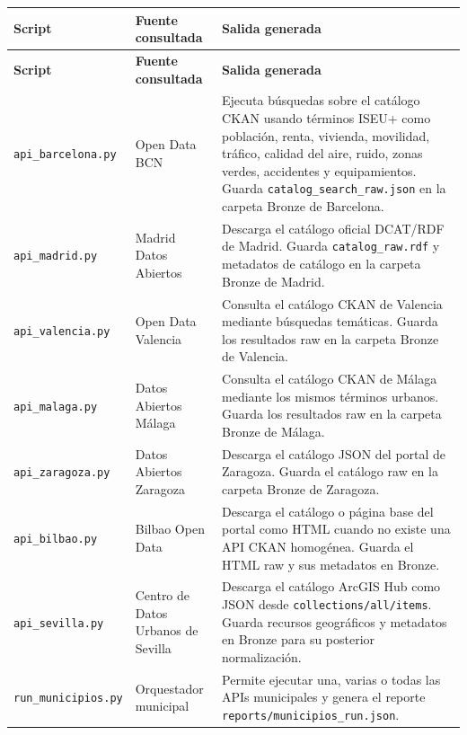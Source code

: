 \begin{longtable}{>{\raggedright\arraybackslash}p{} >{\raggedright\arraybackslash}p{} >{\raggedright\arraybackslash}p{}}
\toprule
\textbf{Script} & \textbf{Fuente consultada} & \textbf{Salida generada} \\
\midrule
\endfirsthead
\toprule
\textbf{Script} & \textbf{Fuente consultada} & \textbf{Salida generada} \\
\midrule
\endhead
\texttt{api\_barcelona.py} & Open Data BCN & Ejecuta búsquedas sobre el catálogo CKAN usando términos ISEU+ como población, renta, vivienda, movilidad, tráfico, calidad del aire, ruido, zonas verdes, accidentes y equipamientos. Guarda \texttt{catalog\_search\_raw.json} en la carpeta Bronze de Barcelona. \\
\texttt{api\_madrid.py} & Madrid Datos Abiertos & Descarga el catálogo oficial DCAT/RDF de Madrid. Guarda \texttt{catalog\_raw.rdf} y metadatos de catálogo en la carpeta Bronze de Madrid. \\
\texttt{api\_valencia.py} & Open Data Valencia & Consulta el catálogo CKAN de Valencia mediante búsquedas temáticas. Guarda los resultados raw en la carpeta Bronze de Valencia. \\
\texttt{api\_malaga.py} & Datos Abiertos Málaga & Consulta el catálogo CKAN de Málaga mediante los mismos términos urbanos. Guarda los resultados raw en la carpeta Bronze de Málaga. \\
\texttt{api\_zaragoza.py} & Datos Abiertos Zaragoza & Descarga el catálogo JSON del portal de Zaragoza. Guarda el catálogo raw en la carpeta Bronze de Zaragoza. \\
\texttt{api\_bilbao.py} & Bilbao Open Data & Descarga el catálogo o página base del portal como HTML cuando no existe una API CKAN homogénea. Guarda el HTML raw y sus metadatos en Bronze. \\
\texttt{api\_sevilla.py} & Centro de Datos Urbanos de Sevilla & Descarga el catálogo ArcGIS Hub como JSON desde \texttt{collections/all/items}. Guarda recursos geográficos y metadatos en Bronze para su posterior normalización. \\
\texttt{run\_}\newline\texttt{municipios.py} & Orquestador municipal & Permite ejecutar una, varias o todas las APIs municipales y genera el reporte \texttt{reports/municipios\_run.json}. \\
\bottomrule
\end{longtable}

